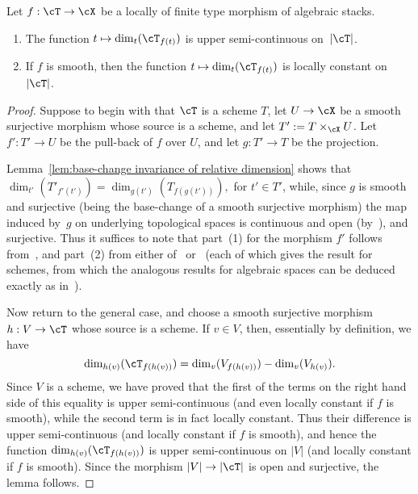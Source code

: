 \begin{alemma}
\label{lem:relative dimension is semi-continuous}
Let $f: \cT \to \cX$ be a locally of finite type morphism of algebraic stacks.
\begin{enumerate}
\item
The function $t \mapsto \dim_t(\cT_{f(t)})$ is upper semi-continuous 
on~$|\cT|$.
\item If $f$ is smooth, then
the function $t \mapsto \dim_t(\cT_{f(t)})$ is locally constant
on~$|\cT|$.
\end{enumerate}
\end{alemma}\begin{proof}
	Suppose to begin with that $\cT$ is a scheme $T$,
	let $U \to \cX$ be a smooth surjective morphism whose source
	is a scheme, and let $T':=T\times_{\cX}U$. Let $f': T' \to U$ be
	the pull-back of $f$ over $U$,
	and let $g: T' \to T$ be the projection.

      	Lemma~\ref{lem:base-change
		invariance of relative dimension}
	shows that $\dim_{t'}(T'_{f'(t')}) = \dim_{g(t')}(T_{f(g(t'))}),$
	for $t' \in T'$, while, 
	since $g$ is smooth and surjective (being the base-change
	of a smooth surjective morphism) the map induced by~$g$ on underlying
	topological spaces is continuous and open
(by~\cite[\href{http://stacks.math.columbia.edu/tag/04XL}{Lem.~04XL}]{stacks-project}), and surjective.
        Thus it suffices to note that part~(1) for the morphism $f'$
	follows from~\cite[\href{http://stacks.math.columbia.edu/tag/04NT}{Tag
  04NT}]{stacks-project}, and part~(2)
from either
of~\cite[\href{http://stacks.math.columbia.edu/tag/02NM}{Lem.~02NM}]{stacks-project}
or~\cite[\href{http://stacks.math.columbia.edu/tag/02G1}{Lem.~02G1}]{stacks-project}
(each of which gives the result for schemes, from which
the analogous results for algebraic spaces can
be deduced exactly as in~\cite[\href{http://stacks.math.columbia.edu/tag/04NT}{Tag
  04NT}]{stacks-project}).

	Now return to the general case,
	and choose a smooth surjective morphism
	$h:V \to \cT$ whose source is a scheme.  
	If $v \in V$, then, essentially by definition,
	we have 
	$$\dim_{h(v)}(\cT_{f(h(v))}) = 
	\dim_{v}(V_{f(h(v))}) - \dim_{v}(V_{h(v)}).$$
	Since $V$ is a scheme, we have proved that the first 
	of the terms on the right hand side of this equality
	is upper semi-continuous (and even locally
	constant if $f$ is smooth), while the second term is 
	in fact locally constant. 
	Thus their difference is upper semi-continuous
	(and locally constant if $f$ is smooth),
	and hence the function
	$\dim_{h(v)}(\cT_{f(h(v))})$
        is upper semi-continuous on $|V|$ (and locally
	constant if $f$ is smooth).  	
        Since the morphism $|V| \to |\cT|$ is open and surjective,
	the lemma follows.
\end{proof}

